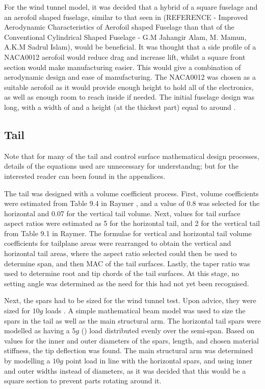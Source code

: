 \documentclass[../../main.tex]{subfiles}
\begin{document}

For the wind tunnel model, it was decided that a hybrid of a square fuselage and an aerofoil shaped fuselage, similar to that seen in (REFERENCE - Improved Aerodynamic Characteristics of Aerofoil shaped Fuselage than that of the Conventional Cylindrical Shaped Fuselage - G.M Jahangir Alam, M. Mamun, A.K.M Sadrul Islam), would be beneficial.
It was thought that a side profile of a NACA0012 aerofoil would reduce drag and increase lift, whilst a square front section would make manufacturing easier.
This would give a combination of aerodynamic design and ease of manufacturing.  
The NACA0012 was chosen as a suitable aerofoil as it would provide enough height to hold all of the electronics, as well as enough room to reach inside if needed. 
The initial fuselage design was  long, with a width of  and a height (at the thickest part) equal to around . 

\subsection{Tail} \label{sec:design-process:preliminary-design:tail}

Note that for many of the tail and control surface mathematical design processes, details of the equations used are unnecessary for understandng; but for the interested reader can been found in the appendices. 

The tail was designed with a volume coefficient process.
First, volume coefficients were estimated from Table 9.4 in Raymer \cite{raymer-89}, and a value of 0.8 was selected for the horizontal and 0.07 for the vertical tail volume.
Next, values for tail surface aspect ratios were estimated as 5 for the horizontal tail, and 2 for the vertical tail from Table 9.1 in Raymer.
The formulae for vertical and horizontal tail volume coefficients for tailplane areas were rearranged to obtain the vertical and horizontal tail areas, where the aspect ratio selected could then be used to determine span, and then MAC of the tail surfaces.
Lastly, the taper ratio was used to determine root and tip chords of the tail surfaces.
At this stage, no setting angle was determined as the need for this had not yet been recognised. 

Next, the spars had to be sized for the wind tunnel test.
Upon advice, they were sized for $10g$ loads \cite{towell-19}.
A simple mathematical beam model was used to size the spars in the tail as well as the main structural arm.
The horizontal tail spars were modelled as having a $5g$ () load distributed evenly over the semi-span.
Based on values for the inner and outer diameters of the spars, length, and chosen material stiffness, the tip deflection was found.
The main structural arm was determined by modelling a $10g$ point load in line with the horizontal spars, and using inner and outer widths instead of diameters, as it was decided that this would be a square section to prevent parts rotating around it.
\end{document}
